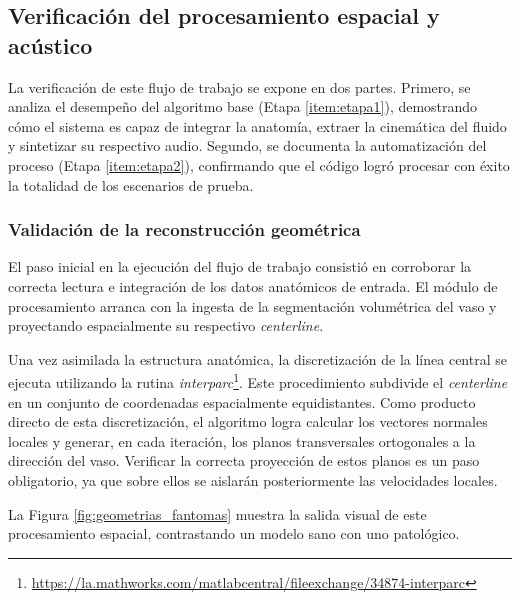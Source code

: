 \subsection{Verificación del procesamiento espacial y acústico}

La verificación de este flujo de trabajo se expone en dos partes. Primero, se analiza el desempeño del algoritmo base (Etapa \ref{item:etapa1}), demostrando cómo el sistema es capaz de integrar la anatomía, extraer la cinemática del fluido y sintetizar su respectivo audio. Segundo, se documenta la automatización del proceso (Etapa \ref{item:etapa2}), confirmando que el código logró procesar con éxito la totalidad de los escenarios de prueba.

\subsubsection{Validación de la reconstrucción geométrica}

El paso inicial en la ejecución del flujo de trabajo consistió en corroborar la correcta lectura e integración de los datos anatómicos de entrada. El módulo de procesamiento arranca con la ingesta de la segmentación volumétrica del vaso y proyectando espacialmente su respectivo \textit{centerline}. 

Una vez asimilada la estructura anatómica, la discretización de la línea central se ejecuta utilizando la rutina \textit{interparc}\footnote{\url{https://la.mathworks.com/matlabcentral/fileexchange/34874-interparc}}. Este procedimiento subdivide el \textit{centerline} en un conjunto de coordenadas espacialmente equidistantes. Como producto directo de esta discretización, el algoritmo logra calcular los vectores normales locales y generar, en cada iteración, los planos transversales ortogonales a la dirección del vaso. Verificar la correcta proyección de estos planos es un paso obligatorio, ya que sobre ellos se aislarán posteriormente las velocidades locales.

La Figura \ref{fig:geometrias_fantomas} muestra la salida visual de este procesamiento espacial, contrastando un modelo sano con uno patológico.

